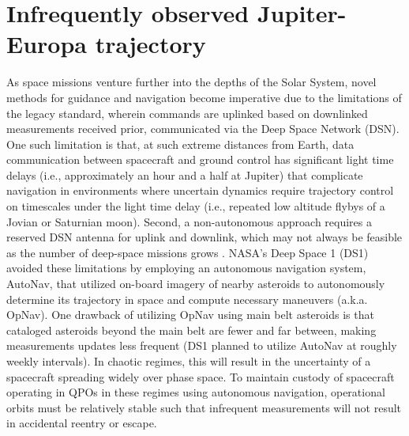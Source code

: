 \documentclass[paper,11pt]{AAS}
\begin{document}
\section{Infrequently observed Jupiter-Europa trajectory}

As space missions venture further into the depths of the Solar System, novel methods for guidance and navigation become imperative due to the limitations of the legacy standard, wherein commands are uplinked based on downlinked measurements received prior, communicated via the Deep Space Network (DSN). One such limitation is that, at such extreme distances from Earth, data communication between spacecraft and ground control has significant light time delays (i.e., approximately an hour and a half at Jupiter) that complicate navigation in environments where uncertain dynamics require trajectory control on timescales under the light time delay (i.e., repeated low altitude flybys of a Jovian or Saturnian moon). Second, a non-autonomous approach requires a reserved DSN antenna for uplink and downlink, which may not always be feasible as the number of deep-space missions grows \cite{sB17,sB19}. NASA's Deep Space 1\cite{sB98,jR00} (DS1) avoided these limitations by employing an autonomous navigation system, AutoNav, that utilized on-board imagery of nearby asteroids to autonomously determine its trajectory in space and compute necessary maneuvers (a.k.a. OpNav). One drawback of utilizing OpNav using main belt asteroids is that cataloged asteroids beyond the main belt are fewer and far between, making measurements updates less frequent (DS1 planned to utilize AutoNav at roughly weekly intervals\cite{sB12}). In chaotic regimes, this will result in the uncertainty of a spacecraft spreading widely over phase space. To maintain custody of spacecraft operating in QPOs in these regimes using autonomous navigation, operational orbits must be relatively stable such that infrequent measurements will not result in accidental reentry or escape. 
\end{document}
